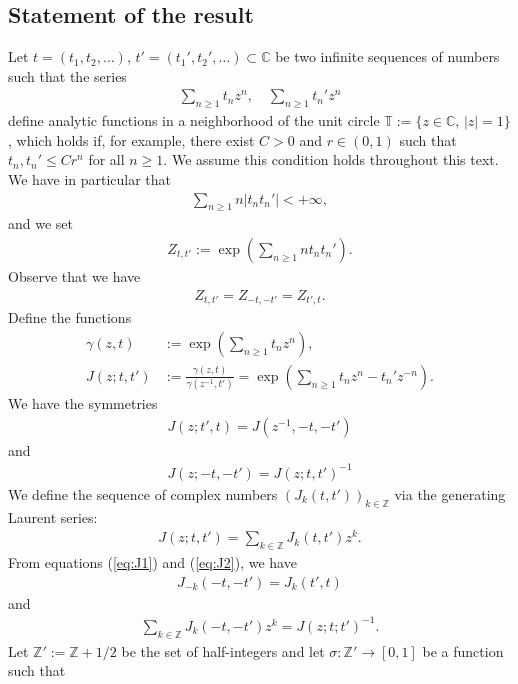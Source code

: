 \documentclass[12pt]{amsart}
\theoremstyle{definition}
\newcommand{\Z}{\mathbb{Z}}
\newcommand{\C}{\mathbb{C}}
\newcommand{\T}{\mathbb{T}}
\begin{document}
\subsection{Statement of the result}
Let $t=(t_1,t_2,\dots)$, $t'=(t_1',t_2',\dots) \subset \C$ be two infinite sequences of numbers such that the series
\begin{align*}
    \sum_{n \geq 1}t_nz^n, \quad\sum_{n \geq 1}t_n'z^n
\end{align*}
define analytic functions in a neighborhood of the unit circle $\T:= \{z \in \C, \, |z|=1\}$, which holds if, for example, there exist $C>0$ and $r\in (0,1)$ such that $t_n,t_n' \leq Cr^n$ for all $n \geq 1$. We assume this condition holds throughout this text. We have in particular that
\begin{align*}
\sum_{n \geq 1} n |t_n t_n'| <+\infty,
\end{align*}
and we set
\begin{align} \label{eq:defZ}
Z_{t,t'}:= \exp \left( \sum_{n \geq 1} nt_n t_n' \right).
\end{align}
Observe that we have
\begin{align}
Z_{t,t'}=Z_{-t,-t'}=Z_{t',t}.
\end{align}
Define the functions
\begin{align*}
\gamma(z,t) &:= \exp \left( \sum_{ n \geq 1} t_n z^n \right),  \\
J(z;t,t')&:= \frac{\gamma(z,t)}{\gamma(z^{-1},t')} = \exp \left( \sum_{n \geq 1} t_nz^n -t_n' z^{-n} \right).
\end{align*}
We have the symmetries
\begin{align} \label{eq:J1}
J(z;t',t) = J(z^{-1},-t,-t')
\end{align}
and
\begin{align} \label{eq:J2}
J(z;-t,-t') = J(z;t,t')^{-1}
\end{align}
We define the sequence of complex numbers $ \left(J_k(t,t') \right)_{k \in \Z} $ via the generating Laurent series:
\begin{align*}
J(z;t,t')= \sum_{k \in \Z} J_k(t,t') z^k.
\end{align*}
From equations (\ref{eq:J1}) and (\ref{eq:J2}), we have
\begin{align} \label{eq:J3}
J_{-k}(-t,-t')= J_k(t',t)
\end{align}
and
\begin{align} \label{eq:J4}
\sum_{k \in \Z}J_k(-t,-t') z^k=  J(z;t;t')^{-1}. 
\end{align}
Let $\Z':= \Z +1/2$ be the set of half-integers and let $\sigma : \Z' \to [0,1]$ be a function such that
\end{document}
